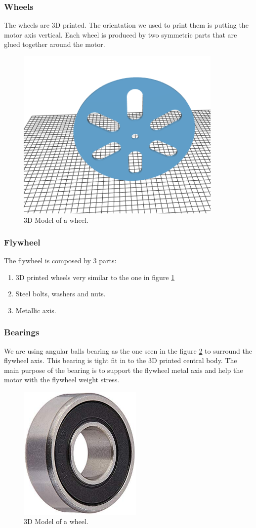 \subsubsection{Wheels}
The wheels are 3D printed. The orientation we used to print them
is putting the motor axis vertical. Each wheel is produced by two
symmetric parts that are glued together around the motor.
\begin{figure}[H]
    \centering
    \includegraphics[width=10cm]{img/components/wheel.png}
    \caption{3D Model of a wheel.}
    \label{fig: 3D wheel}
\end{figure}
\subsubsection{Flywheel}
The flywheel is composed by 3 parts:
\begin{enumerate}
    \item 3D printed wheels very similar to the one in figure \ref{fig: 3D wheel}
    \item Steel bolts, washers and nuts.
    \item Metallic axis.
\end{enumerate}
\subsubsection{Bearings}
We are using angular balls bearing as the one seen in the figure
\ref{fig: photo bearing} to surround the flywheel axis. This bearing is
tight fit in to the 3D printed central body. The main purpose of the bearing
is to support the flywheel metal axis and help the motor with the flywheel weight
stress.
\begin{figure}[H]
    \centering
    \includegraphics[width=6cm]{img/bearing.jpg}
    \caption{3D Model of a wheel.}
    \label{fig: photo bearing}
\end{figure}
